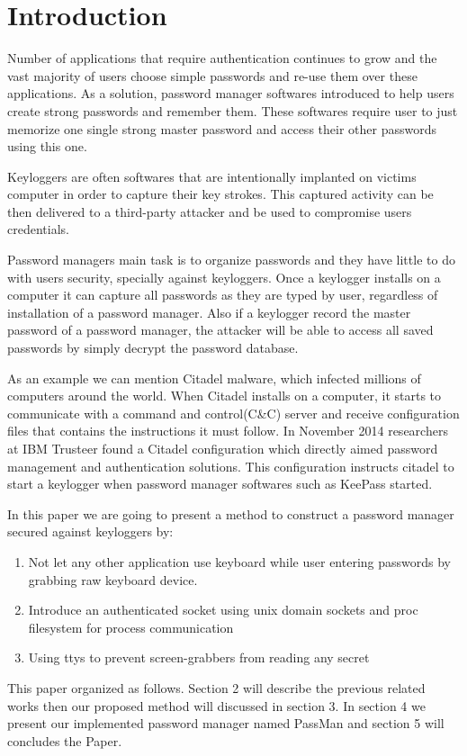 \section{Introduction}

 Number of applications that require authentication continues to grow and the vast majority of users choose simple passwords and re-use them over these applications. As a solution, password manager softwares introduced to help users create strong passwords and remember them. These softwares require user to just memorize one single strong master password and access their other passwords using this one.

Keyloggers are often softwares that are intentionally implanted on victims computer in order to capture their key strokes. This captured activity can be then delivered to a third-party attacker \cite{holz2009learning} and be used to compromise users credentials.

Password managers main task is to organize passwords and they have little to do with users security, specially against keyloggers. Once a keylogger installs on a computer it can capture all passwords as they are typed by user, regardless of installation of a password manager. Also if a keylogger record the master password of a password manager, the attacker will be able to access all saved passwords by simply decrypt the password database.

As an example we can mention Citadel malware, which infected millions of computers around the world. When Citadel installs on a computer, it starts to communicate with a command and control(C\&C) server and receive configuration files that contains the instructions it must follow. In November 2014 researchers at IBM Trusteer found a Citadel configuration which directly aimed password management and authentication solutions. This configuration instructs citadel to start a keylogger when password manager softwares such as KeePass started. \cite{securityintelligence:citadel}

In this paper we are going to present a method to construct a password manager secured against keyloggers by:

\begin{enumerate}

\item Not let any other application use keyboard while user entering passwords by grabbing raw keyboard device.
\item Introduce an authenticated socket using unix domain sockets and proc filesystem for process communication
\item Using ttys to prevent screen-grabbers from reading any secret
\end{enumerate}

This paper organized as follows. Section 2 will describe the previous related works then our proposed method will discussed in section 3. In section 4 we present our implemented  password manager named PassMan and section 5 will concludes the Paper.  